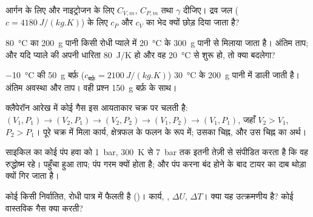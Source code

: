 \begin{exercise}[$\star$]\label{exo:b1:first-law:4}
आर्गन के लिए और नाइट्रोजन के लिए $C_{V,m}$, $C_{P,m}$ तथा $\gamma$ दीजिए।
द्रव जल ($c = \qty{4180}{J/(kg.K)}$) के लिए $c_P$ और
$c_V$ का भेद क्यों छोड़ दिया जाता है?
\end{exercise}

\begin{exercise}[$\star\star$]\label{exo:b1:first-law:5}
\qty{80}{\degreeCelsius} का \qty{200}{g} पानी किसी रोधी प्याले में
\qty{20}{\degreeCelsius} के \qty{300}{g} पानी से मिलाया जाता है। अंतिम ताप;
और यदि प्याले की अपनी  धारिता \qty{80}{J/K} हो और वह
\qty{20}{\degreeCelsius} से शुरू हो, तो क्या बदलेगा?
\end{exercise}

\begin{exercise}[$\star\star$]\label{exo:b1:first-law:6}
\qty{-10}{\degreeCelsius} की \qty{50}{g} बर्फ़ ($c_{\text{बर्फ़}} = \qty{2100}{J/(kg.K)}$)
\qty{30}{\degreeCelsius} के \qty{200}{g} पानी में डाली जाती है। अंतिम
अवस्था और ताप। वही प्रश्न \qty{150}{g} बर्फ़ के साथ।
\end{exercise}

\begin{exercise}[$\star\star$]\label{exo:b1:first-law:7}
क्लैपेरॉन आरेख में कोई गैस इस आयताकार चक्र पर चलती है: $(V_1, P_1)
\to (V_2, P_1) \to (V_2, P_2) \to (V_1, P_2) \to (V_1, P_1)$, जहाँ $V_2 > V_1$,
$P_2 > P_1$। पूरे चक्र में मिला कार्य, क्षेत्रफल के फलन के रूप में; उसका
चिह्न, और उस चिह्न का अर्थ।
\end{exercise}

\begin{exercise}[$\star\star$]\label{exo:b1:first-law:8}
साइकिल का कोई पंप हवा को \qty{1}{bar}, \qty{300}{K} से \qty{7}{bar} तक
इतनी तेज़ी से संपीडित करता है कि वह रुद्धोष्म रहे। पहुँचा हुआ ताप; पंप गरम
क्यों होता है; और पंप करना बंद होने के बाद टायर का दाब थोड़ा क्यों गिर
जाता है।
\end{exercise}

\begin{exercise}[$\star\star$]\label{exo:b1:first-law:9}
कोई  किसी निर्वातित, रोधी पात्र में फैलती है ()। कार्य,
, $\Delta U$, $\Delta T$। क्या यह  उत्क्रमणीय है? कोई
वास्तविक गैस क्या करती?
\end{exercise}

